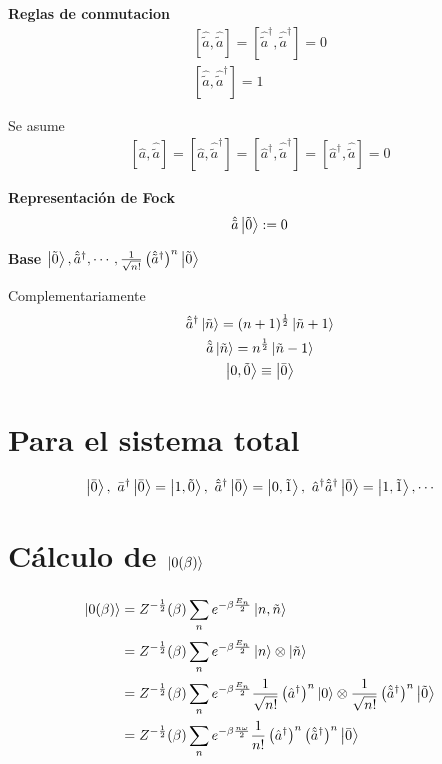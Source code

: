 \documentclass{article}
\begin{document}
\textbf{Reglas de conmutacion }
\begin{gather*}
  \left[ \hat{\tilde a} , \hat{\tilde a}  \right]  = \left[\hat{\tilde a }^ {\dagger }, \hat{\tilde a } ^ {\dagger }\right] = 0 \\
  \left[ \hat{\tilde a } , \hat{\tilde a }^ {\dagger }  \right] = 1
\end{gather*}

Se asume 
\begin{gather*}
  \left[ \hat a  ,  \hat{\tilde a }  \right] = \left[ \hat a  , \hat{\tilde a } ^ {\dagger }  \right] = \left[ \hat a ^ {\dagger } , \hat{\tilde a }^ {\dagger }  \right] = \left[ \hat a ^ {\dagger } , \hat{\tilde a }  \right] = 0
\end{gather*}

\textbf{Representación de Fock }
\begin{gather*}
  \hat{\tilde a } \ket{\tilde 0 } := 0
\end{gather*}

\textbf{Base } $ \ket{\tilde 0 }, \hat{\tilde a}^ {\dagger }, \cdots, \frac{1}{\sqrt{n! } }\left(\hat{\tilde a } ^ {\dagger }\right)^n \ket{\tilde 0 } $

Complementariamente 
\begin{gather*}
  \hat{\tilde a } ^ {\dagger } \ket{\tilde n } = (n+1) ^ {\frac{1}{2}}\ket{\tilde n + 1 }\\
  \hat{\tilde a } \ket{\tilde n } = n ^ {\frac{1}{2}} \ket{\tilde n - 1 }  \\
  \ket{0, \tilde 0 } \equiv \ket{\bar 0 }
\end{gather*}

\section{Para el sistema total }
\begin{gather*}
  \ket{\bar 0 }, \ \bar a ^ {\dagger } \ket{\bar 0 } = \ket{1, \tilde 0 },\ \hat{\tilde a } ^ {\dagger } \ket{\bar 0 } = \ket{0,\tilde 1},\ \hat a ^ {\dagger } \hat{\tilde a } ^ {\dagger } \ket{\bar 0 }= \ket{1, \tilde 1 }, \cdots
\end{gather*}

\section{Cálculo de $ \ket{0(\beta)} $}
\begin{align*}
  \ket{0(\beta)} &= Z ^ {- \frac{1}{2}}(\beta) \displaystyle\sum_{n }^{} e ^ {- \beta \frac{E_n }{2}}\ket{n , \tilde n }\\
  &= Z ^ {- \frac{1}{2}}(\beta) \displaystyle\sum_{n }^{} e ^ {- \beta \frac{E_n }{2}} \ket{n } \otimes \ket{\tilde n }\\
  &=Z ^ {- \frac{1}{2}}(\beta) \displaystyle\sum_{n }^{} e ^ {- \beta \frac{E_n }{2}} \frac{1}{\sqrt{n! } }\left(\hat a ^ {\dagger }\right)^n \ket{0 } \otimes \frac{1}{\sqrt{n! } } \left(\hat{\tilde a }^ {\dagger }\right) ^ {n } \ket{\tilde 0 } \\
  &= Z ^ {- \frac{1}{2}}(\beta) \displaystyle\sum_{n }^{} e ^ {- \beta \frac{n\omega }{2}} \frac{1}{n! } \left(\hat a ^ {\dagger }\right)^n\left(\hat{\tilde a} ^ {\dagger }\right)^n \ket{\bar 0 }
\end{align*}
\end{document}
